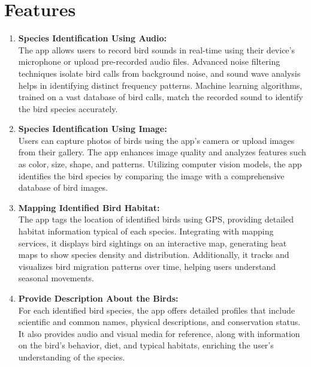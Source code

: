 \section{Features}
\begin{enumerate}
    \item \textbf{Species Identification Using Audio:}\\
          The app allows users to record bird sounds in real-time using their device's microphone or
          upload pre-recorded audio files. Advanced noise filtering techniques isolate bird calls from
          background noise, and sound wave analysis helps in identifying distinct frequency patterns.
          Machine learning algorithms, trained on a vast database of bird calls, match the recorded
          sound to identify the bird species accurately.

    \item \textbf{Species Identification Using Image:}\\
          Users can capture photos of birds using the app's camera or upload images from their gallery.
          The app enhances image quality and analyzes features such as color, size, shape, and patterns.
          Utilizing computer vision models, the app identifies the bird species by comparing the image
          with a comprehensive database of bird images.

    \item \textbf{Mapping Identified Bird Habitat:}\\
          The app tags the location of identified birds using GPS, providing detailed habitat information
          typical of each species. Integrating with mapping services, it displays bird sightings on an
          interactive map, generating heat maps to show species density and distribution. Additionally,
          it tracks and visualizes bird migration patterns over time, helping users understand seasonal
          movements.

    \item \textbf{Provide Description About the Birds:}\\
          For each identified bird species, the app offers detailed profiles that include scientific and
          common names, physical descriptions, and conservation status. It also provides audio and visual
          media for reference, along with information on the bird's behavior, diet, and typical habitats,
          enriching the user's understanding of the species.

\end{enumerate}

